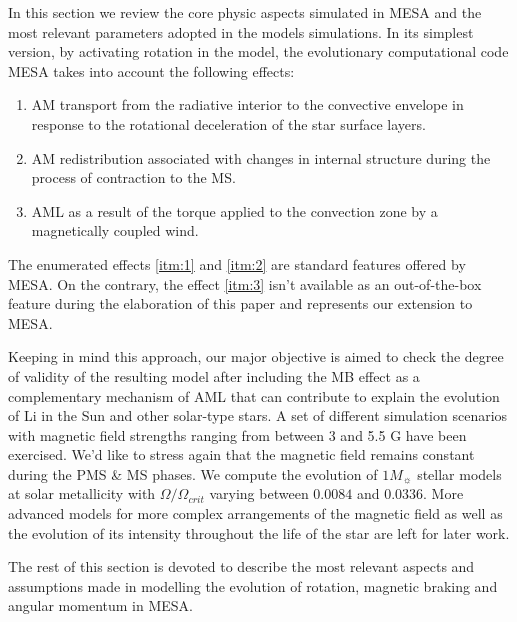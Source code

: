 \documentclass[fleqn,usenatbib]{mnras}
\begin{document}
In this section we review the core physic aspects simulated in MESA and the most relevant parameters adopted in the models simulations. In its simplest version, by activating rotation in the model, the evolutionary computational code MESA takes into account the following effects:
\begin{enumerate}
    \item AM transport from the radiative interior to the convective envelope in response to the rotational deceleration of the star surface layers\label{itm:1}.
    \item AM redistribution associated with changes in internal structure during the process of contraction to the MS\label{itm:2}.
    \item AML as a result of the torque applied to the convection zone by a magnetically coupled wind\label{itm:3}.
\end{enumerate}

The enumerated effects \ref{itm:1} and \ref{itm:2} are standard features offered by MESA. On the contrary, the effect \ref{itm:3} isn't available as an out-of-the-box feature during the elaboration of this paper and represents our extension to MESA.

Keeping in mind this approach, our major objective is aimed to check the degree of validity of the resulting model after including the MB effect as a complementary mechanism of AML that can contribute to explain the evolution of Li in the Sun and other solar-type stars. A set of different simulation scenarios with magnetic field strengths ranging from between 3 and 5.5 G have been exercised. We'd like to stress again that the magnetic field remains constant during the PMS \& MS phases. We compute the evolution of $1M_{\sun}$ stellar models at solar metallicity with $\Omega / \Omega_{crit}$ varying between $0.0084$ and $0.0336$. More advanced models for more complex arrangements of the magnetic field as well as the evolution of its intensity throughout the life of the star are left for later work.\par

The rest of this section is devoted to describe the most relevant aspects and assumptions made in modelling the evolution of rotation, magnetic braking and angular momentum in MESA.\par
\end{document}
